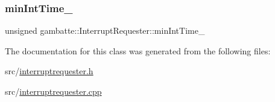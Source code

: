 \mbox{\label{classgambatte_1_1InterruptRequester_a2bdaa2560a52a5c12a80c470466bc8d0}} 
\subsubsection{\texorpdfstring{min\+Int\+Time\+\_\+}{minIntTime\_}}
{\footnotesize\ttfamily unsigned gambatte\+::\+Interrupt\+Requester\+::min\+Int\+Time\+\_\+\hspace{0.3cm}{\ttfamily [private]}}



The documentation for this class was generated from the following files\+:\begin{DoxyCompactItemize}
\item 
src/\hyperlink{interruptrequester_8h}{interruptrequester.\+h}\item 
src/\hyperlink{interruptrequester_8cpp}{interruptrequester.\+cpp}\end{DoxyCompactItemize}
